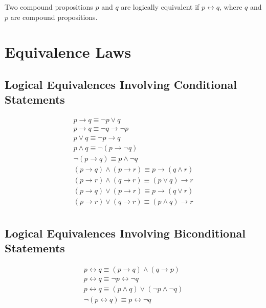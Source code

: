\documentclass[12pt letter]{report}
\begin{document}
Two compound propositions $p$ and $q$ are logically equivalent if $p \leftrightarrow q$, where $q$ and $p$ are compound propositions.

\section{Equivalence Laws}

\subsection{Logical Equivalences Involving Conditional Statements}

\begin{align*}
	p \to q \equiv \neg p \vee q                                                                  \\
	p \to q \equiv \neg q \to \neg p                                                              \\
	p \vee q \equiv \neg p \to q                                                                  \\
	p \wedge q \equiv \neg \left( p \to \neg q  \right)                                           \\
	\neg  \left( p \to q \right) \equiv p \wedge \neg q                                           \\
	\left( p \to q  \right)  \wedge \left( p \to r \right) \equiv p \to \left( q \wedge r \right) \\
	\left( p \to r \right)  \wedge \left( q \to r \right)  \equiv \left( p \vee q \right) \to r   \\
	\left( p \to q  \right) \vee \left( p \to r \right) \equiv p \to \left( q \vee r \right)      \\
	\left( p \to r \right) \vee \left( q \to r \right) \equiv \left( p \wedge q \right) \to r     \\
\end{align*}

\subsection{Logical Equivalences Involving Biconditional Statements}

\begin{align*}
	p \leftrightarrow q \equiv \left( p\to q \right) \wedge \left( q \to   p \right)              \\
	p \leftrightarrow q \equiv \neg p \leftrightarrow \neg q                                      \\
	p \leftrightarrow q \equiv \left( p \wedge q \right) \vee \left( \neg p \wedge \neg q \right) \\
	\neg \left( p \leftrightarrow q \right) \equiv p \leftrightarrow \neg q                       \\
\end{align*}
\end{document}
